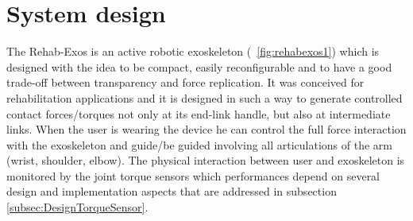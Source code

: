 
\section{System design} \label{sec:systemDesign}
The Rehab-Exos is an active robotic exoskeleton (\figurename \ \ref{fig:rehabexos1}) which is designed with the idea to be compact, easily reconfigurable and to have a good trade-off between transparency and force replication.
It was conceived for rehabilitation applications and it is designed in such a way to generate controlled contact forces/torques not only at its end-link handle, but also at  intermediate links. When the user is wearing the device he can control the full force interaction with the exoskeleton and guide/be guided involving all articulations of the arm (wrist, shoulder, elbow). 
The physical interaction between user and exoskeleton is monitored by the joint torque sensors which performances depend on several design and implementation aspects that are addressed in subsection \ref{subsec:DesignTorqueSensor}.
